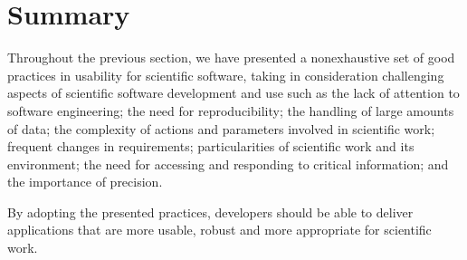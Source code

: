 \documentclass[conference]{IEEEtran}
\begin{document}
%





\section{Summary}
Throughout the previous section, we have presented a nonexhaustive set of good 
practices in usability for scientific software, taking in consideration 
challenging aspects of scientific software development and use such as the lack 
of attention to software engineering; the need for reproducibility; the handling 
of large amounts of data; the complexity of actions and parameters involved in 
scientific work; frequent changes in requirements; particularities of scientific 
work and its environment; the need for accessing and responding to critical 
information; and the importance of precision.

By adopting the presented practices, developers should be
able to deliver applications that are more usable, robust and more appropriate 
for scientific work.
\end{document}
